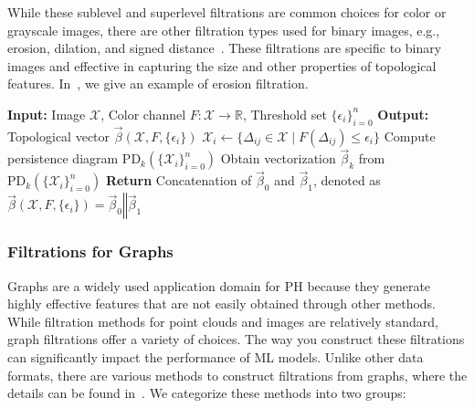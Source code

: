While these sublevel and superlevel filtrations are common choices for color or grayscale images, there are other filtration types used for binary images, e.g., erosion, dilation, and signed distance~\cite{garin2019topological}. These filtrations are specific to binary images and effective in capturing the size and other properties of topological features. In~, we give an example of erosion filtration.




\begin{algorithm}[t]
\caption{PH Machinery for Images with Cubical Persistence \label{alg:PH_image}}
\label{alg:cubical}
\begin{algorithmic}[1]
\State \textbf{Input:} Image $\mathcal{X}$, Color channel $F: \mathcal{X} \to \mathbb{R}$, Threshold set $\{\epsilon_i\}_{i=0}^n$
\State \textbf{Output:} Topological vector $\vec{\beta}(\mathcal{X}, F, \{\epsilon_i\})$
 
    \State $\mathcal{X}_i \gets \{\Delta_{ij} \in \mathcal{X} \mid F(\Delta_{ij}) \leq \epsilon_i\}$ 
\EndFor
{} 
    \State Compute persistence diagram $\mathrm{PD}_k(\{\mathcal{X}_i\}_{i=0}^n)$
    \State Obtain vectorization $\vec{\beta}_k$ from $\mathrm{PD}_k(\{\mathcal{X}_i\}_{i=0}^n)$
\EndFor
\State \textbf{Return} Concatenation of $\vec{\beta}_0$ and $\vec{\beta}_1$, denoted as $\vec{\beta}(\mathcal{X}, F, \{\epsilon_i\}) = \vec{\beta}_0 \mathbin\Vert \vec{\beta}_1$
\end{algorithmic}
\end{algorithm}











\subsubsection{Filtrations for Graphs} \label{sec:graph}

Graphs are a widely used application domain for PH because they generate highly effective features that are not easily obtained through other methods. While filtration methods for point clouds and images are relatively standard, graph filtrations offer a variety of choices. The way you construct these filtrations can significantly impact the performance of ML models. Unlike other data formats, there are various methods to construct filtrations from graphs, where the details can be found in~\cite{aktas2019persistence}. We categorize these methods into two groups:



